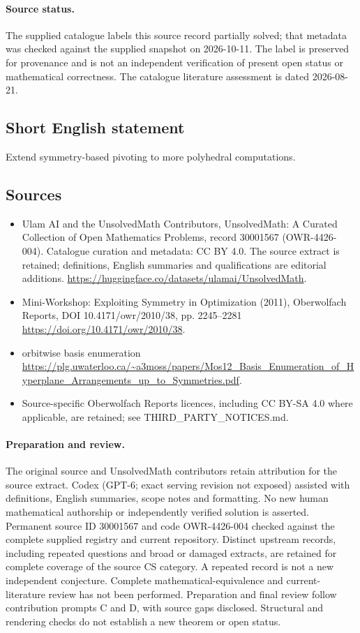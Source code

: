 \documentclass[11pt]{article}
\begin{document}
\paragraph{Source status.}
The supplied catalogue labels this source record partially solved; that metadata was checked against the supplied snapshot on 2026-10-11. The label is preserved for provenance and is not an independent verification of present open status or mathematical correctness. The catalogue literature assessment is dated 2026-08-21.
\subsection{Short English statement}
Extend symmetry-based pivoting to more polyhedral computations.
\subsection{Sources}
\begin{itemize}
\item[S1] Ulam AI and the UnsolvedMath Contributors, UnsolvedMath: A Curated Collection of Open Mathematics Problems, record 30001567 (OWR-4426-004). Catalogue curation and metadata: CC BY 4.0. The source extract is retained; definitions, English summaries and qualifications are editorial additions.
\url{https://huggingface.co/datasets/ulamai/UnsolvedMath}.
\item[S2] Mini-Workshop: Exploiting Symmetry in Optimization (2011), Oberwolfach Reports, DOI 10.4171/owr/2010/38, pp. 2245--2281
\url{https://doi.org/10.4171/owr/2010/38}.
\item[S3] orbitwise basis enumeration
\url{https://plg.uwaterloo.ca/~a3moss/papers/Mos12_Basis_Enumeration_of_Hyperplane_Arrangements_up_to_Symmetries.pdf}.
\item Source-specific Oberwolfach Reports licences, including CC BY-SA 4.0 where applicable, are retained; see THIRD\_PARTY\_NOTICES.md.
\end{itemize}
\paragraph{Preparation and review.}
The original source and UnsolvedMath contributors retain attribution for the source extract. Codex (GPT-6; exact serving revision not exposed) assisted with definitions, English summaries, scope notes and formatting. No new human mathematical authorship or independently verified solution is asserted. Permanent source ID 30001567 and code OWR-4426-004 checked against the complete supplied registry and current repository. Distinct upstream records, including repeated questions and broad or damaged extracts, are retained for complete coverage of the source CS category. A repeated record is not a new independent conjecture. Complete mathematical-equivalence and current-literature review has not been performed. Preparation and final review follow contribution prompts C and D, with source gaps disclosed. Structural and rendering checks do not establish a new theorem or open status.
\label{end:30001567}
\end{document}
